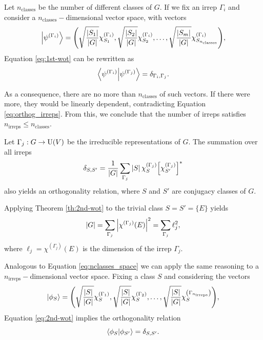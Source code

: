 Let $n_{\text{classes}}$ be the number of different classes of $G$. If we fix an irrep $\Gamma_i$ and consider a $n_{\text{classes}} -$dimensional vector space, with vectors
\begin{equation} \label{eq:nclasses_space}
\ket{\psi^{(\Gamma_i)}} =
\qty(
\sqrt{\frac{\abs{S_1}}{\abs{G}}} \chi^{(\Gamma_i)}_{S_1},
\sqrt{\frac{\abs{S_2}}{\abs{G}}} \chi^{(\Gamma_i)}_{S_2},
\ldots,
\sqrt{\frac{\abs{S_m}}{\abs{G}}} \chi^{(\Gamma_i)}_{S_{n_{\text{classes}}}}
),
\end{equation}
Equation \ref{eq:1st-wot} can be rewritten as
\begin{equation} \label{eq:orthog_irreps}
\braket{\psi^{(\Gamma_i)}}{\psi^{(\Gamma_j)}} = \delta_{\Gamma_i, \Gamma_j}.
\end{equation}

As a consequence, there are no more than $n_{\text{classes}}$ of such vectors. If there were more, they would be linearly dependent, contradicting Equation \ref{eq:orthog_irreps}. From this, we conclude that the number of irreps satisfies $n_{\text{irreps}} \leq n_{\text{classes}}$.

\begin{theorem} \label{th:2nd-wot}
Let $\Gamma_j: G \to {\text{U}}(V)$ be the irreducible representations of $G$. The summation over all irreps
\begin{equation} \label{eq:2nd-wot}
\delta_{S, S'} = \frac{1}{\abs{G}} \sum_{\Gamma_j} \abs{S} \, \chi^{(\Gamma_j)}_S \qty[\chi^{(\Gamma_j)}_{S'}]^*
\end{equation}
also yields an orthogonality relation, where $S$ and $S'$ are conjugacy classes of $G$.
\end{theorem}

\begin{corollary} \label{coro:chi_E}
Applying Theorem \ref{th:2nd-wot} to the trivial class $S = S' = \{E\}$ yields
\begin{equation} \label{eq:chi_E_coro}
\abs{G} = \sum_{\Gamma_j} \abs{\chi^{(\Gamma_j)}(E)}^2 = \sum_{\Gamma_j} \ell_j^2,
\end{equation}
where $\ell_j = \chi^{(\Gamma_j)}(E)$ is the dimension of the irrep $\Gamma_j$.
\end{corollary}

Analogous to Equation \ref{eq:nclasses_space} we can apply the same reasoning to a $n_{\text{irreps}}-$dimensional vector space. Fixing a class $S$ and considering the vectors
\begin{equation} \label{eq:nirreps_space}
\ket{\phi_{S}} =
\qty(
\sqrt{\frac{\abs{S}}{\abs{G}}} \chi^{(\Gamma_1)}_{S},
\sqrt{\frac{\abs{S}}{\abs{G}}} \chi^{(\Gamma_2)}_{S},
\ldots,
\sqrt{\frac{\abs{S}}{\abs{G}}} \chi^{\qty(\Gamma_{n_{\text{irreps}}})}_{S}
),
\end{equation}
Equation \ref{eq:2nd-wot} implies the orthogonality relation
$$
\braket{\phi_{S}}{\phi_{S'}} = \delta_{S, S'}.
$$

